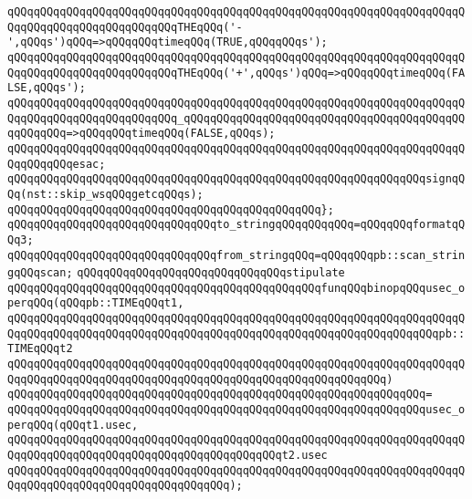 \verb|qQQqqQQqqQQqqQQqqQQqqQQqqQQqqQQqqQQqqQQqqQQqqQQqqQQqqQQqqQQqqQQqqQQqqQQqqQQqqQQqqQQqqQQqqQQqqQQqTHEqQQq('-',qQQqs')qQQq=>qQQqqQQqtimeqQQq(TRUE,qQQqqQQqs');|\newline
\verb|qQQqqQQqqQQqqQQqqQQqqQQqqQQqqQQqqQQqqQQqqQQqqQQqqQQqqQQqqQQqqQQqqQQqqQQqqQQqqQQqqQQqqQQqqQQqqQQqTHEqQQq('+',qQQqs')qQQq=>qQQqqQQqtimeqQQq(FALSE,qQQqs');|\newline
\verb|qQQqqQQqqQQqqQQqqQQqqQQqqQQqqQQqqQQqqQQqqQQqqQQqqQQqqQQqqQQqqQQqqQQqqQQqqQQqqQQqqQQqqQQqqQQqqQQq_qQQqqQQqqQQqqQQqqQQqqQQqqQQqqQQqqQQqqQQqqQQqqQQqqQQq=>qQQqqQQqtimeqQQq(FALSE,qQQqs);|\newline
\verb|qQQqqQQqqQQqqQQqqQQqqQQqqQQqqQQqqQQqqQQqqQQqqQQqqQQqqQQqqQQqqQQqqQQqqQQqqQQqqQQqesac;|\newline
\newline
\verb|qQQqqQQqqQQqqQQqqQQqqQQqqQQqqQQqqQQqqQQqqQQqqQQqqQQqqQQqqQQqqQQqsignqQQq(nst::skip_wsqQQqgetcqQQqs);|\newline
\verb|qQQqqQQqqQQqqQQqqQQqqQQqqQQqqQQqqQQqqQQqqQQqqQQq};|\newline
\newline
\verb|qQQqqQQqqQQqqQQqqQQqqQQqqQQqqQQqto_stringqQQqqQQqqQQq=qQQqqQQqformatqQQq3;|\newline
\verb|qQQqqQQqqQQqqQQqqQQqqQQqqQQqqQQqfrom_stringqQQq=qQQqqQQqpb::scan_stringqQQqscan;|\newline
\newline
\verb|qQQqqQQqqQQqqQQqqQQqqQQqqQQqqQQqstipulate|\newline
\verb|qQQqqQQqqQQqqQQqqQQqqQQqqQQqqQQqqQQqqQQqqQQqqQQqfunqQQqbinopqQQqusec_operqQQq(qQQqpb::TIMEqQQqt1,|\newline
\verb|qQQqqQQqqQQqqQQqqQQqqQQqqQQqqQQqqQQqqQQqqQQqqQQqqQQqqQQqqQQqqQQqqQQqqQQqqQQqqQQqqQQqqQQqqQQqqQQqqQQqqQQqqQQqqQQqqQQqqQQqqQQqqQQqqQQqqQQqpb::TIMEqQQqt2|\newline
\verb|qQQqqQQqqQQqqQQqqQQqqQQqqQQqqQQqqQQqqQQqqQQqqQQqqQQqqQQqqQQqqQQqqQQqqQQqqQQqqQQqqQQqqQQqqQQqqQQqqQQqqQQqqQQqqQQqqQQqqQQqqQQqqQQq)|\newline
\verb|qQQqqQQqqQQqqQQqqQQqqQQqqQQqqQQqqQQqqQQqqQQqqQQqqQQqqQQqqQQqqQQq=|\newline
\verb|qQQqqQQqqQQqqQQqqQQqqQQqqQQqqQQqqQQqqQQqqQQqqQQqqQQqqQQqqQQqqQQqusec_operqQQq(qQQqt1.usec,|\newline
\verb|qQQqqQQqqQQqqQQqqQQqqQQqqQQqqQQqqQQqqQQqqQQqqQQqqQQqqQQqqQQqqQQqqQQqqQQqqQQqqQQqqQQqqQQqqQQqqQQqqQQqqQQqqQQqqQQqt2.usec|\newline
\verb|qQQqqQQqqQQqqQQqqQQqqQQqqQQqqQQqqQQqqQQqqQQqqQQqqQQqqQQqqQQqqQQqqQQqqQQqqQQqqQQqqQQqqQQqqQQqqQQqqQQqqQQq);|\newline
